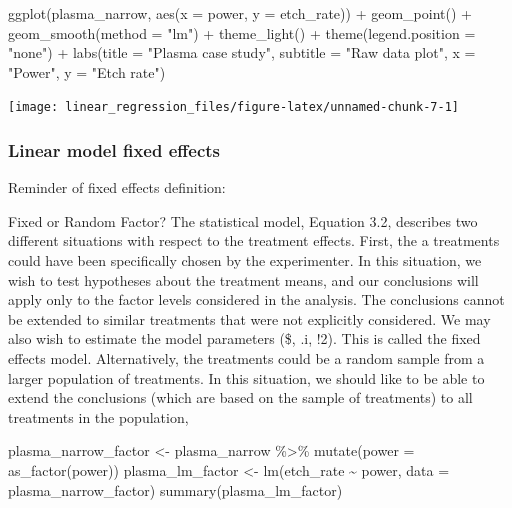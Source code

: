 \documentclass[
]{book}
\newenvironment{Shaded}{\begin{snugshade}}{\end{snugshade}}
\newcommand{\AttributeTok}[1]{\textcolor[rgb]{0.77,0.63,0.00}{#1}}
\newcommand{\FunctionTok}[1]{\textcolor[rgb]{0.00,0.00,0.00}{#1}}
\newcommand{\NormalTok}[1]{#1}
\newcommand{\OtherTok}[1]{\textcolor[rgb]{0.56,0.35,0.01}{#1}}
\newcommand{\SpecialCharTok}[1]{\textcolor[rgb]{0.00,0.00,0.00}{#1}}
\newcommand{\StringTok}[1]{\textcolor[rgb]{0.31,0.60,0.02}{#1}}
\begin{document}
\begin{Shaded}
\begin{Highlighting}[]
\FunctionTok{ggplot}\NormalTok{(plasma\_narrow, }\FunctionTok{aes}\NormalTok{(}\AttributeTok{x =}\NormalTok{ power, }\AttributeTok{y =}\NormalTok{ etch\_rate)) }\SpecialCharTok{+}
  \FunctionTok{geom\_point}\NormalTok{() }\SpecialCharTok{+}
  \FunctionTok{geom\_smooth}\NormalTok{(}\AttributeTok{method =} \StringTok{"lm"}\NormalTok{) }\SpecialCharTok{+}
  \FunctionTok{theme\_light}\NormalTok{() }\SpecialCharTok{+}
  \FunctionTok{theme}\NormalTok{(}\AttributeTok{legend.position =} \StringTok{"none"}\NormalTok{) }\SpecialCharTok{+}
  \FunctionTok{labs}\NormalTok{(}\AttributeTok{title =} \StringTok{"Plasma case study"}\NormalTok{,}
       \AttributeTok{subtitle =} \StringTok{"Raw data plot"}\NormalTok{,}
       \AttributeTok{x =} \StringTok{"Power"}\NormalTok{,}
       \AttributeTok{y =} \StringTok{"Etch rate"}\NormalTok{)}
\end{Highlighting}
\end{Shaded}

\texttt{[image: linear\_regression\_files/figure-latex/unnamed-chunk-7-1]}

\hypertarget{linear-model-fixed-effects}{%
\subsubsection{Linear model fixed effects}\label{linear-model-fixed-effects}}

Reminder of fixed effects definition:

Fixed or Random Factor? The statistical model, Equation 3.2, describes two different situations with respect to the treatment effects. First, the a treatments could have been specifically chosen by the experimenter. In this situation, we wish to test hypotheses about the treatment means, and our conclusions will apply only to the factor levels considered in the analysis. The conclusions cannot be extended to similar treatments that were not explicitly considered. We may also wish to estimate the model parameters (\$, .i, !2). This is called the fixed effects model. Alternatively, the treatments could be a random sample from a larger population of treatments. In this situation, we should like to be able to extend the conclusions (which are based on the sample of treatments) to all treatments in the population,

\begin{Shaded}
\begin{Highlighting}[]
\NormalTok{plasma\_narrow\_factor }\OtherTok{\textless{}{-}}\NormalTok{ plasma\_narrow }\SpecialCharTok{\%\textgreater{}\%}
  \FunctionTok{mutate}\NormalTok{(}\AttributeTok{power =} \FunctionTok{as\_factor}\NormalTok{(power))}
\NormalTok{plasma\_lm\_factor }\OtherTok{\textless{}{-}} \FunctionTok{lm}\NormalTok{(etch\_rate }\SpecialCharTok{\textasciitilde{}}\NormalTok{ power, }\AttributeTok{data =}\NormalTok{ plasma\_narrow\_factor)}
\FunctionTok{summary}\NormalTok{(plasma\_lm\_factor)}
\end{Highlighting}
\end{Shaded}
\end{document}
